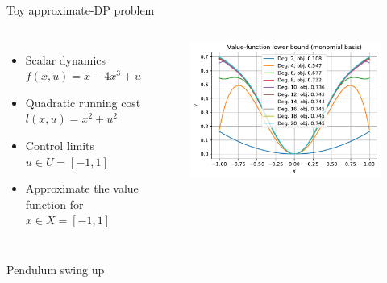 \documentclass[aspectratio=169]{beamer}
\begin{document}
\begin{frame}{Toy approximate-DP problem
\href{https://colab.research.google.com/github/TobiaMarcucci/optimal_control_pisa/blob/master/demos/approximate_dp_scalar.ipynb}{}}
\begin{columns}
\begin{itemize}
	\item
	Scalar dynamics $f(x, u)= x - 4 x^3 + u$
	\item
	Quadratic running cost $l(x, u) = x^2 + u^2$
	\item
	Control limits $u \in U = [-1, 1]$
	\item
	Approximate the value function for $x \in X = [-1, 1]$
\end{itemize}
	\begin{figure}
		\includegraphics[width=\columnwidth]{figures/approximate_dp_scalar.pdf}
	\end{figure}
\end{columns}
\end{frame}

\begin{frame}{Pendulum swing up
\href{https://colab.research.google.com/github/TobiaMarcucci/optimal_control_pisa/blob/master/demos/swing_up.ipynb}{}}
	
\end{frame}
\end{document}
